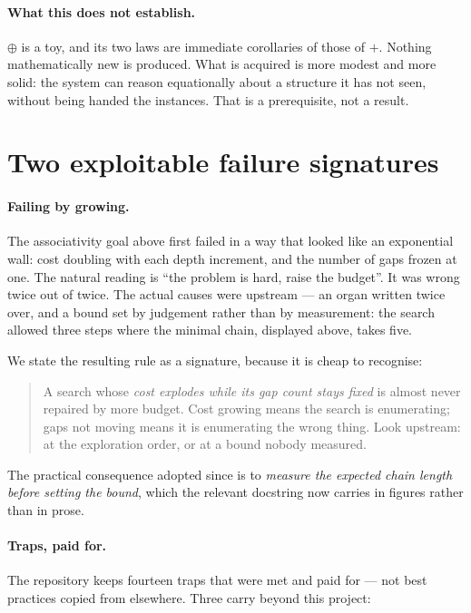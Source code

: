 \documentclass[11pt]{article}
\theoremstyle{remark}\newtheorem{remark}{Remark}
\begin{document}
\paragraph{What this does not establish.} $\oplus$ is a toy, and its two laws are
immediate corollaries of those of $+$. Nothing mathematically new is produced. What is
acquired is more modest and more solid: the system can reason equationally about a
structure it has not seen, without being handed the instances. That is a prerequisite,
not a result.

\section{Two exploitable failure signatures}
\label{sec:signatures}

\paragraph{Failing by growing.} The associativity goal above first failed in a way that
looked like an exponential wall: cost doubling with each depth increment, and the number
of gaps frozen at one. The natural reading is ``the problem is hard, raise the budget''.
It was wrong twice out of twice. The actual causes were upstream --- an organ written
twice over, and a bound set by judgement rather than by measurement: the search allowed
three steps where the minimal chain, displayed above, takes five.

We state the resulting rule as a signature, because it is cheap to recognise:

\begin{quote}
A search whose \emph{cost explodes while its gap count stays fixed} is almost never
repaired by more budget. Cost growing means the search is enumerating; gaps not moving
means it is enumerating the wrong thing. Look upstream: at the exploration order, or at a
bound nobody measured.
\end{quote}

The practical consequence adopted since is to \emph{measure the expected chain length
before setting the bound}, which the relevant docstring now carries in figures rather
than in prose.

\paragraph{Traps, paid for.} The repository keeps fourteen traps that were met and paid
for --- not best practices copied from elsewhere. Three carry beyond this project:
\end{document}
